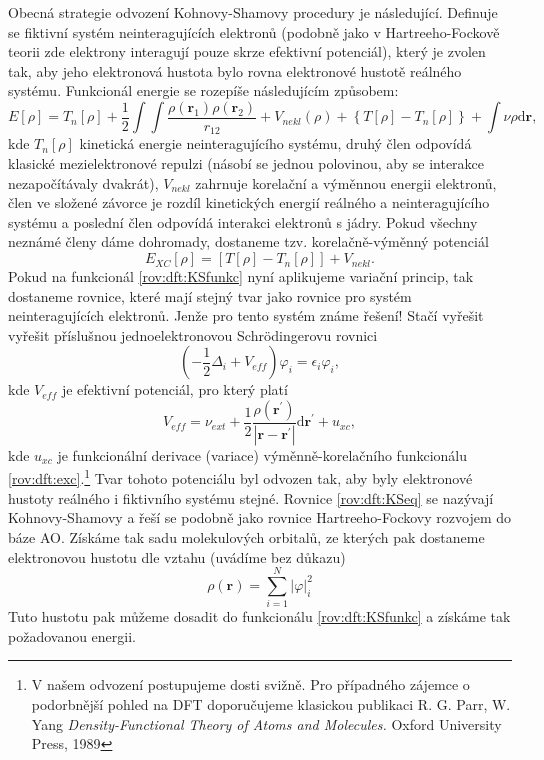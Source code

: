 Obecná strategie odvození Kohnovy-Shamovy procedury je následující. Definuje se fiktivní systém neinteragujících elektronů (podobně jako v Hartreeho-Fockově teorii zde elektrony interagují pouze skrze efektivní potenciál), který je zvolen tak, aby jeho elektronová hustota bylo rovna elektronové hustotě reálného systému. 
Funkcionál energie se rozepíše následujícím způsobem:
\begin{equation}
E[\rho]= T_{n}[\rho] + \frac{1}{2}\int \int \frac{\rho(\textbf{r}_1)\rho(\textbf{r}_2)}{r_{12}} + V_{nekl}(\rho) +\left\lbrace T[\rho]-T_{n}[\rho]\right\rbrace + \int \nu \rho \mathrm{d}\textbf{r},
\label{rov:dft:KSfunkc}
\end{equation}
kde $T_{n}[\rho]$ kinetická energie neinteragujícího systému, druhý člen odpovídá klasické mezielektronové repulzi (násobí se jednou polovinou, aby se interakce nezapočítávaly dvakrát), $V_{nekl}$ zahrnuje korelační a výměnnou energii elektronů, člen ve složené závorce je rozdíl kinetických energií reálného a neinteragujícího systému  a poslední člen odpovídá interakci elektronů s jádry. Pokud všechny neznámé členy dáme dohromady, dostaneme tzv. korelačně-výměnný potenciál
\begin{equation}	
E_{XC}[\rho]=\left[T[\rho]-T_{n}[\rho]\right] +  V_{nekl} .
\label{rov:dft:exc}
\end{equation}
Pokud na funkcionál \eqref{rov:dft:KSfunkc} nyní aplikujeme variační princip, tak dostaneme rovnice, které mají stejný tvar jako rovnice
pro systém neinteragujících elektronů. Jenže pro tento systém známe řešení! Stačí vyřešit vyřešit příslušnou jednoelektronovou  	 Schr\"{o}dingerovu rovnici
\begin{equation}
\left(-\frac{1}{2}\Delta_i + V_{eff} \right) \varphi_i =\epsilon_i \varphi_i ,
\label{rov:dft:KSeq}
\end{equation}
kde $V_{eff}$ je efektivní potenciál, pro který platí
\begin{equation}
V_{eff}=\nu_{ext}+\frac{1}{2}\frac{\rho(\textbf{r}^{\prime})}{|\textbf{r}-\textbf{r}^{\prime}|}\mathrm{d}\textbf{r}^{\prime}+u_{xc} ,
\end{equation}
kde $u_{xc}$ je funkcionální derivace (variace) výměnně-korelačního funkcionálu \ref{rov:dft:exc}.\footnote{V našem odvození postupujeme dosti svižně. Pro případného zájemce o podorbnější pohled na DFT doporučujeme klasickou publikaci R. G. Parr, W. Yang \textit{Density-Functional Theory of Atoms and Molecules.} Oxford University Press, 1989} Tvar tohoto potenciálu byl odvozen tak, aby byly elektronové hustoty reálného i fiktivního systému stejné.
Rovnice \ref{rov:dft:KSeq} se nazývají Kohnovy-Shamovy a řeší se podobně jako rovnice Hartreeho-Fockovy rozvojem do báze AO.
Získáme tak sadu molekulových orbitalů, ze kterých pak dostaneme elektronovou hustotu dle vztahu (uvádíme bez důkazu)
\begin{equation}
\rho(\textbf{r}) = \sum_{i=1}^N |\varphi|_i^2
\label{rov:dft:KSrho}
\end{equation}
Tuto hustotu pak můžeme dosadit do funkcionálu \eqref{rov:dft:KSfunkc} a získáme tak požadovanou energii.

